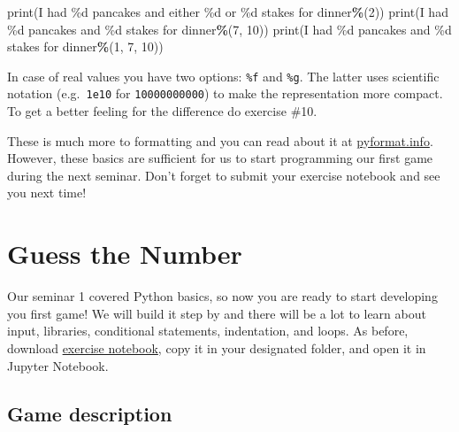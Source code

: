 \documentclass[
]{book}
\newenvironment{Shaded}{\begin{snugshade}}{\end{snugshade}}
\newcommand{\BuiltInTok}[1]{#1}
\newcommand{\DecValTok}[1]{\textcolor[rgb]{0.00,0.00,0.81}{#1}}
\newcommand{\NormalTok}[1]{#1}
\newcommand{\OperatorTok}[1]{\textcolor[rgb]{0.81,0.36,0.00}{\textbf{#1}}}
\newcommand{\SpecialCharTok}[1]{\textcolor[rgb]{0.00,0.00,0.00}{#1}}
\newcommand{\StringTok}[1]{\textcolor[rgb]{0.31,0.60,0.02}{#1}}
\begin{document}
\begin{Shaded}
\begin{Highlighting}[]
\BuiltInTok{print}\NormalTok{(}\StringTok{\textquotesingle{}I had }\SpecialCharTok{\%d}\StringTok{ pancakes and either }\SpecialCharTok{\%d}\StringTok{  or }\SpecialCharTok{\%d}\StringTok{ stakes for dinner\textquotesingle{}}\OperatorTok{\%}\NormalTok{(}\DecValTok{2}\NormalTok{))}
\BuiltInTok{print}\NormalTok{(}\StringTok{\textquotesingle{}I had }\SpecialCharTok{\%d}\StringTok{ pancakes and }\SpecialCharTok{\%d}\StringTok{ stakes for dinner\textquotesingle{}}\OperatorTok{\%}\NormalTok{(}\DecValTok{7}\NormalTok{, }\DecValTok{10}\NormalTok{))}
\BuiltInTok{print}\NormalTok{(}\StringTok{\textquotesingle{}I had }\SpecialCharTok{\%d}\StringTok{ pancakes and }\SpecialCharTok{\%d}\StringTok{ stakes for dinner\textquotesingle{}}\OperatorTok{\%}\NormalTok{(}\DecValTok{1}\NormalTok{, }\DecValTok{7}\NormalTok{, }\DecValTok{10}\NormalTok{))}
\end{Highlighting}
\end{Shaded}

In case of real values you have two options: \texttt{\%f} and \texttt{\%g}. The latter uses scientific notation (e.g.~\texttt{1e10} for \texttt{10000000000}) to make the representation more compact. To get a better feeling for the difference do exercise \#10.

These is much more to formatting and you can read about it at \href{https://pyformat.info/}{pyformat.info}. However, these basics are sufficient for us to start programming our first game during the next seminar. Don't forget to submit your exercise notebook and see you next time!

\hypertarget{seminar02}{%
\chapter{Guess the Number}\label{seminar02}}

Our seminar 1 covered Python basics, so now you are ready to start developing you first game! We will build it step by and there will be a lot to learn about input, libraries, conditional statements, indentation, and loops. As before, download \href{notebooks/Seminar\%2002.\%20Guess\%20the\%20number.ipynb}{exercise notebook}, copy it in your designated folder, and open it in Jupyter Notebook.

\hypertarget{game-description}{%
\section{Game description}\label{game-description}}
\end{document}
